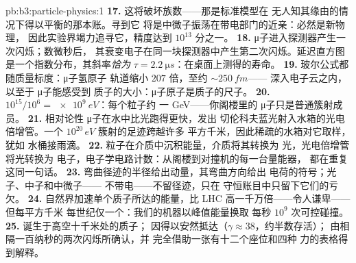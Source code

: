 \begin{solution}{pb:b3:particle-physics:1}
\textbf{17.} 这将破坏族数——那是标准模型在
无人知其缘由的情况下得以平衡的那本账。寻到它
将是中微子振荡在带电部门的近亲：必然是新物理，
因此实验界竭力追寻它，精度达到
$10^{13}$ 分之一。
\textbf{18.} μ子进入探测器产生一次闪烁；数微秒后，
其衰变电子在同一块探测器中产生第二次闪烁。延迟直方图
是一个指数分布，其斜率\emph{恰为}
$\tau = \qty{2.2}{\micro s}$：在桌面上测得的寿命。
\textbf{19.} 玻尔公式都随质量标度：μ子氢原子
轨道缩小 $207$ 倍，至约 ${\sim}\qty{250}{fm}$——
深入电子云之内，以至于 μ子能感受到
质子的大小：μ子原子是质子的尺子。
\textbf{20.} $10^{15}/10^{6} = \qty{e9}{eV}$：每个粒子约
一 GeV——你阁楼里的 μ子只是普通簇射成员。
\textbf{21.} 相对论性 μ子在水中比光跑得更快，发出
切伦科夫蓝光射入水箱的光电倍增管。一个
$10^{20}\,\unit{eV}$ 簇射的足迹跨越许多
平方千米，因此稀疏的水箱对它取样，犹如
水桶接雨滴。
\textbf{22.} 粒子在介质中沉积能量，介质将其转换为
光，光电倍增管将光转换为
电子，电子学电路计数：从阁楼到对撞机的每一台量能器，
都在重复这同一句话。
\textbf{23.} 弯曲径迹的半径给出动量，其弯曲方向给出
电荷的符号；光子、中子和中微子——
不带电——不留径迹，只在
守恒账目中只留下它们的亏欠。
\textbf{24.} 自然界加速单个质子所达的能量，比
LHC 高一千万倍——令人谦卑——但每平方千米
每世纪仅一个：我们的机器以峰值能量换取
每秒 $10^{9}$ 次可控碰撞。
\textbf{25.} 诞生于高空十千米处的质子；
因得以安然抵达（$\gamma \approx 38$，约半数存活）；
由相隔一百纳秒的两次闪烁所确认，并
完全借助一张有十二个座位和四种
力的表格得到解释。
\end{solution}
